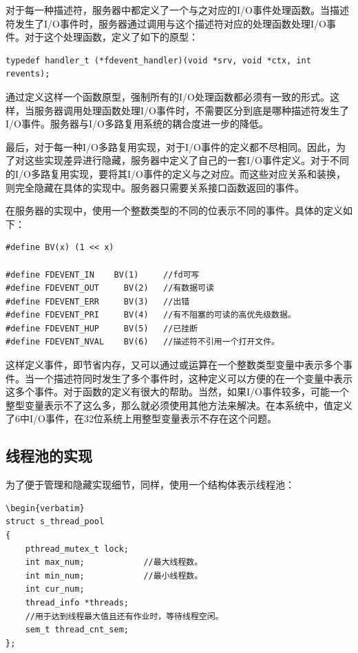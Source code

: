 \documentclass[twoside, xetex]{report}
\begin{document}
	对于每一种描述符，服务器中都定义了一个与之对应的I/O事件处理函数。当描述符发生了I/O事件时，服务器通过调用与这个描述符对应的处理函数处理I/O事件。对于这个处理函数，定义了如下的原型：
\begin{verbatim}
typedef handler_t (*fdevent_handler)(void *srv, void *ctx, int revents);
\end{verbatim}

	通过定义这样一个函数原型，强制所有的I/O处理函数都必须有一致的形式。这样，当服务器调用处理函数处理I/O事件时，不需要区分到底是哪种描述符发生了I/O事件。服务器与I/O多路复用系统的耦合度进一步的降低。
	
	最后，对于每一种I/O多路复用实现，对于I/O事件的定义都不尽相同。因此，为了对这些实现差异进行隐藏，服务器中定义了自己的一套I/O事件定义。对于不同的I/O多路复用实现，要将其I/O事件的定义与之对应。而这些对应关系和装换，则完全隐藏在具体的实现中。服务器只需要关系接口函数返回的事件。
	
	在服务器的实现中，使用一个整数类型的不同的位表示不同的事件。具体的定义如下：
\begin{verbatim}	
#define BV(x) (1 << x)

#define FDEVENT_IN	  BV(1) 	//fd可写
#define FDEVENT_OUT 	BV(2) 	//有数据可读
#define FDEVENT_ERR 	BV(3) 	//出错
#define FDEVENT_PRI 	BV(4) 	//有不阻塞的可读的高优先级数据。
#define FDEVENT_HUP 	BV(5) 	//已挂断
#define FDEVENT_NVAL	BV(6) 	//描述符不引用一个打开文件。
\end{verbatim}

	这样定义事件，即节省内存，又可以通过或运算在一个整数类型变量中表示多个事件。当一个描述符同时发生了多个事件时，这种定义可以方便的在一个变量中表示这多个事件。对于函数的定义有很大的帮助。当然，如果I/O事件较多，可能一个整型变量表示不了这么多，那么就必须使用其他方法来解决。在本系统中，值定义了6中I/O事件，在32位系统上用整型变量表示不存在这个问题。
	
\subsection{线程池的实现}
	为了便于管理和隐藏实现细节，同样，使用一个结构体表示线程池：
\begin{verbatim}
\begin{verbatim}
struct s_thread_pool
{
	pthread_mutex_t lock; 
	int max_num;            //最大线程数。
	int min_num;            //最小线程数。
	int cur_num; 
	thread_info *threads;
	//用于达到线程最大值且还有作业时，等待线程空闲。
	sem_t thread_cnt_sem;   
};
\end{verbatim}
\end{document}
